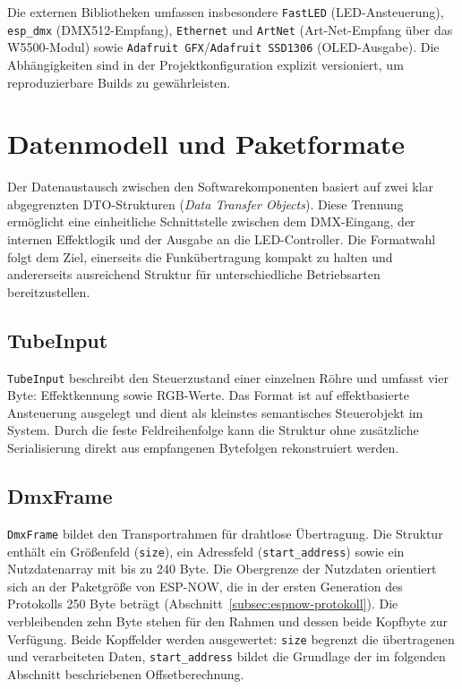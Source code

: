 Die externen Bibliotheken umfassen insbesondere \texttt{FastLED}
(LED-Ansteuerung), \texttt{esp\_dmx} (DMX512-Empfang), \texttt{Ethernet}
und \texttt{ArtNet} (Art-Net-Empfang über das W5500-Modul) sowie
\texttt{Adafruit GFX}/\texttt{Adafruit SSD1306} (OLED-Ausgabe). Die
Abhängigkeiten sind in der Projektkonfiguration explizit versioniert,
um reproduzierbare Builds zu gewährleisten.

\section{Datenmodell und Paketformate}
\label{sec:datenmodell}

Der Datenaustausch zwischen den Softwarekomponenten basiert auf zwei
klar abgegrenzten DTO-Strukturen (\textit{Data Transfer Objects}).
Diese Trennung ermöglicht eine einheitliche Schnittstelle zwischen dem
DMX-Eingang, der internen Effektlogik und der Ausgabe an die
LED-Controller. Die Formatwahl folgt dem Ziel, einerseits die
Funkübertragung kompakt zu halten und andererseits ausreichend Struktur
für unterschiedliche Betriebsarten bereitzustellen.

\subsection{TubeInput}
\label{subsec:tubeinput}

\texttt{TubeInput} beschreibt den Steuerzustand einer einzelnen Röhre
und umfasst vier Byte: Effektkennung sowie RGB-Werte. Das Format ist auf effektbasierte Ansteuerung
ausgelegt und dient als kleinstes semantisches Steuerobjekt im System.
Durch die feste Feldreihenfolge kann die Struktur ohne zusätzliche
Serialisierung direkt aus empfangenen Bytefolgen rekonstruiert werden.

\subsection{DmxFrame}
\label{subsec:dmxframe}

\texttt{DmxFrame} bildet den Transportrahmen für
drahtlose Übertragung. Die Struktur enthält ein Größenfeld
(\texttt{size}), ein Adressfeld (\texttt{start\_address}) sowie ein
Nutzdatenarray mit bis zu 240 Byte. Die Obergrenze der Nutzdaten
orientiert sich an der Paketgröße von ESP-NOW, die in der ersten
Generation des Protokolls 250 Byte beträgt
(Abschnitt~\ref{subsec:espnow-protokoll}). Die verbleibenden zehn Byte
stehen für den Rahmen und dessen beide Kopfbyte zur Verfügung. Beide
Kopffelder werden ausgewertet: \texttt{size} begrenzt die übertragenen
und verarbeiteten Daten, \texttt{start\_address} bildet die Grundlage
der im folgenden Abschnitt beschriebenen Offsetberechnung.

